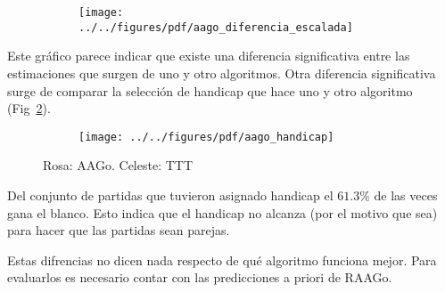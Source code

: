 \documentclass[a4paper,10pt]{article}
\begin{document}
 \begin{figure}[H]\centering
\begin{subfigure}[t]{0.66\textwidth}
\texttt{[image: ../../figures/pdf/aago\_diferencia\_escalada]} 
\end{subfigure}
\caption{}
\label{aago_diferencia_escalada}
\end{figure}

Este gr\'afico parece indicar que existe una diferencia significativa entre las estimaciones que surgen de uno y otro algoritmos.
Otra diferencia significativa surge de comparar la selecci\'on de handicap que hace uno y otro algoritmo (Fig~\ref{aago_handicap}). 

\begin{figure}[H]\centering
\begin{subfigure}[t]{0.66\textwidth}
\texttt{[image: ../../figures/pdf/aago\_handicap]} 
\end{subfigure}
\caption{Rosa: AAGo. Celeste: TTT}
\label{aago_handicap}
\end{figure}

Del conjunto de partidas que tuvieron asignado handicap el $61.3\%$ de las veces gana el blanco.
Esto indica que el handicap no alcanza (por el motivo que sea) para hacer que las partidas sean parejas.

\vspace{0.3cm}

Estas difrencias no dicen nada respecto de qu\'e algoritmo funciona mejor.
Para evaluarlos es necesario contar con las predicciones a priori de RAAGo.
\end{document}
